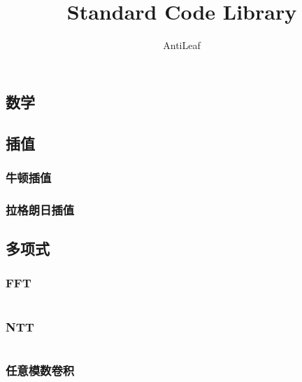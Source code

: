 \documentclass[a4paper]{article}
\title{Standard Code Library}
\author{AntiLeaf}
\date{}
\begin{document}
	\begin{titlepage}
		
		

	\end{titlepage}

	\begin{multicols}{2}
		
		\begin{spacing}{1}
			\tableofcontents
		\end{spacing}
		\newpage

	\end{multicols}

	\begin{multicols}{2}

		\section{数学}

			\subsection{插值}
				\subsubsection{牛顿插值}
					

				\subsubsection{拉格朗日插值}
					
			
			\subsection{多项式}
				\subsubsection{FFT}
					\inputminted{cpp}{../src/math/FFT.cpp}

				\subsubsection{NTT}
					\inputminted{cpp}{../src/math/NTT.cpp}

				\subsubsection{任意模数卷积}
					


\end{multicols}
\end{document}
